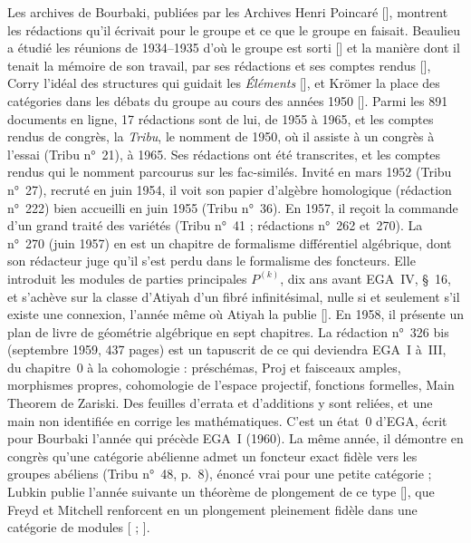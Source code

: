\documentclass[11pt]{amsart}
\newcommand{\ts}[1]{\foreignlanguage{english}{#1}}
\begin{document}
Les archives de Bourbaki, publiées par les Archives Henri Poincaré [\citealp{ahpbourbaki}], montrent les rédactions qu'il écrivait pour le groupe et ce que le groupe en faisait. Beaulieu a étudié les réunions de 1934--1935 d'où le groupe est sorti [\citealp{parshall1993}] et la manière dont il tenait la mémoire de son travail, par ses rédactions et ses comptes rendus [\citealp{beaulieu1999}], Corry l'idéal des structures qui guidait les \emph{Éléments} [\citealp{corry2004}], et Krömer la place des catégories dans les débats du groupe au cours des années 1950 [\citealp{kromer2006}]. Parmi les 891 documents en ligne, 17 rédactions sont de lui, de 1955 à 1965, et les comptes rendus de congrès, la \emph{Tribu}, le nomment de 1950, où il assiste à un congrès à l'essai (Tribu n°~21), à 1965. Ses rédactions ont été transcrites, et les comptes rendus qui le nomment parcourus sur les fac-similés. Invité en mars 1952 (Tribu n°~27), recruté en juin 1954, il voit son papier d'algèbre homologique (rédaction n°~222) bien accueilli en juin 1955 (Tribu n°~36). En 1957, il reçoit la commande d'un grand traité des variétés (Tribu n°~41 ; rédactions n°~262 et~270). La n°~270 (juin 1957) en est un chapitre de formalisme différentiel algébrique, dont son rédacteur juge qu'il s'est perdu dans le formalisme des foncteurs. Elle introduit les modules de parties principales $P^{(k)}$, dix ans avant EGA~IV, §~16, et s'achève sur la classe d'Atiyah d'un fibré infinitésimal, nulle si et seulement s'il existe une connexion, l'année même où Atiyah la publie [\citealp{atiyah1957}]. En 1958, il présente un plan de livre de géométrie algébrique en sept chapitres. La rédaction n°~326 bis (septembre 1959, 437 pages) est un tapuscrit de ce qui deviendra EGA~I à~III, du chapitre~0 à la cohomologie : préschémas, Proj et faisceaux amples, morphismes propres, cohomologie de l'espace projectif, fonctions formelles, \ts{Main Theorem} de Zariski. Des feuilles d'errata et d'additions y sont reliées, et une main non identifiée en corrige les mathématiques. C'est un état~0 d'EGA, écrit pour Bourbaki l'année qui précède EGA~I (1960). La même année, il démontre en congrès qu'une catégorie abélienne admet un foncteur exact fidèle vers les groupes abéliens (Tribu n°~48, p.~8), énoncé vrai pour une petite catégorie ; Lubkin publie l'année suivante un théorème de plongement de ce type [\citealp{lubkin1960}], que Freyd et Mitchell renforcent en un plongement pleinement fidèle dans une catégorie de modules [\citealp{freyd1964} ; \citealp{mitchell1964}].
\end{document}
